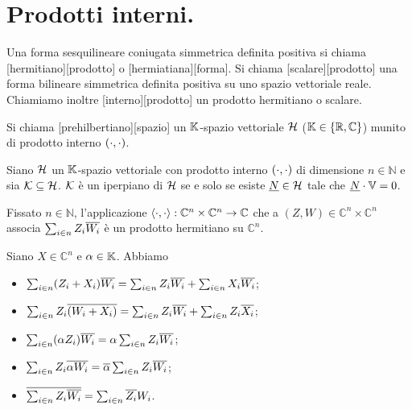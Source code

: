 \section{Prodotti interni.}
\label{GeometriaLineare_ProdottiInterni}
\begin{Definition}
	Una forma sesquilineare coniugata simmetrica definita positiva si chiama
  [hermitiano][prodotto] o
  [hermiatiana][forma].
  Si chiama
  [scalare][prodotto]
  una forma bilineare simmetrica definita positiva su uno spazio vettoriale
  reale.
  Chiamiamo inoltre
  [interno][prodotto]
  un prodotto hermitiano o scalare.
\end{Definition}
\begin{Definition}
  Si chiama
  [prehilbertiano][spazio]
  un $\mathbb{K}$-spazio vettoriale $\mathcal{H}$
  ($\mathbb{K} \in \lbrace \mathbb{R}, \mathbb{C} \rbrace$)
  munito di prodotto interno $\left ( \cdot , \cdot \right )$.
\end{Definition}
\begin{Theorem}
	Siano $\mathcal{H}$ un $\mathbb{K}$-spazio vettoriale con prodotto interno
  $\left ( \cdot , \cdot \right )$
  di dimensione
  $n \in \mathbb{N}$ e sia
  $\mathcal{K} \subseteq \mathcal{H}$.
  $\mathcal{K}$ \`e un iperpiano di $\mathcal{H}$ se e solo se
  esiste $\underline{N} \in \mathcal{H}$ tale che
  $\underline{N} \cdot \mathbb{V} = 0$.
\end{Theorem}
\begin{Theorem}
	Fissato $n \in \mathbb{N}$, l'applicazione
  $\left \langle \cdot , \cdot \right \rangle:
  \mathbb{C}^n \times \mathbb{C}^n \rightarrow \mathbb{C}$
  che a
  $(Z,W) \in \mathbb{C}^n \times \mathbb{C}^n$
  associa
  $\sum_{i \in n} Z_i \overline{W_i}$
  \`e un prodotto hermitiano su $\mathbb{C}^n$.
\end{Theorem}
\Proof Siano $X \in \mathbb{C}^n$ e $\alpha \in \mathbb{K}$. Abbiamo
\begin{itemize}
	\item $\sum_{i \in n} (Z_i + X_i) \overline{W_i}
          = \sum_{i \in n} Z_i \overline{W_i}
          + \sum_{i \in n} X_i \overline{W_i}$;
	\item $\sum_{i \in n} Z_i \overline{(W_i + X_i)}
          = \sum_{i \in n} Z_i \overline{W_i}
          + \sum_{i \in n} Z_i \overline{X_i}$;
	\item $\sum_{i \in n} (\alpha Z_i) \overline{W_i}
          = \alpha \sum_{i \in n} Z_i \overline{W_i}$;
	\item $\sum_{i \in n} Z_i \overline{\alpha W_i}
          = \overline{\alpha} \sum_{i \in n} Z_i \overline{W_i}$;
	\item $\overline{\sum_{i \in n} Z_i \overline{W_i}}
          = \sum_{i \in n} \overline{Z_i} W_i$. \EndProof
\end{itemize}
